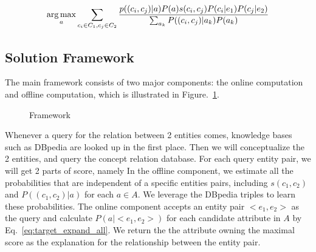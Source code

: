 \begin{equation}
\label{eq:target_expand_all}
\begin{split}
 \operatorname*{arg\,max}_a \sum_{c_i\in C_1, c_j\in C_2}\frac{ p((c_{i},c_{j})|a) P(a) s(c_i,c_j) P(c_i|e_1) P(c_j|e_2) }{ \sum_{a_k}{P( (c_{i},c_{j})|a_k) P(a_k)   } }
\end{split}
\end{equation}



\subsection{Solution Framework}
The main framework consists of two major components: the online computation and offline computation, which is illustrated in Figure.~\ref{fig:framework}.

\begin{figure}[!hptb]
\label{fig:framework}
\centering
{}
\caption{Framework }
\end{figure}

Whenever a query for the relation between 2 entities comes, knowledge bases such as DBpedia are looked up in the first place.
Then  we will conceptualize the 2 entities, and query the concept relation database. For each query entity pair, we will get 2 parts of score, namely
In the offline component, we estimate all the probabilities that are independent of a specific entities pairs, including $s(c_1,c_2)$ and $P((c_{1},c_{2})|a)$ for each $a\in A$.
We leverage the DBpedia triples to learn these probabilities.
The online component accepts an entity pair $<e_1, e_2>$ as the query and calculate $ P(a| <e_1,e_2> )$ for each candidate attribute in $A$ by Eq.~\ref{eq:target_expand_all}. We return the the attribute owning the maximal score as the explanation for the relationship between the entity pair.






